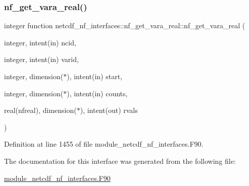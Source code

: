 \subsubsection{\texorpdfstring{nf\+\_\+get\+\_\+vara\+\_\+real()}{nf\_get\_vara\_real()}}
{\footnotesize\ttfamily integer function netcdf\+\_\+nf\+\_\+interfaces\+::nf\+\_\+get\+\_\+vara\+\_\+real\+::nf\+\_\+get\+\_\+vara\+\_\+real (\begin{DoxyParamCaption}\item[{integer, intent(in)}]{ncid,  }\item[{integer, intent(in)}]{varid,  }\item[{integer, dimension($\ast$), intent(in)}]{start,  }\item[{integer, dimension($\ast$), intent(in)}]{counts,  }\item[{real(nfreal), dimension($\ast$), intent(out)}]{rvals }\end{DoxyParamCaption})}



Definition at line 1455 of file module\+\_\+netcdf\+\_\+nf\+\_\+interfaces.\+F90.



The documentation for this interface was generated from the following file\+:\begin{DoxyCompactItemize}
\item 
\hyperlink{module__netcdf__nf__interfaces_8F90}{module\+\_\+netcdf\+\_\+nf\+\_\+interfaces.\+F90}\end{DoxyCompactItemize}
